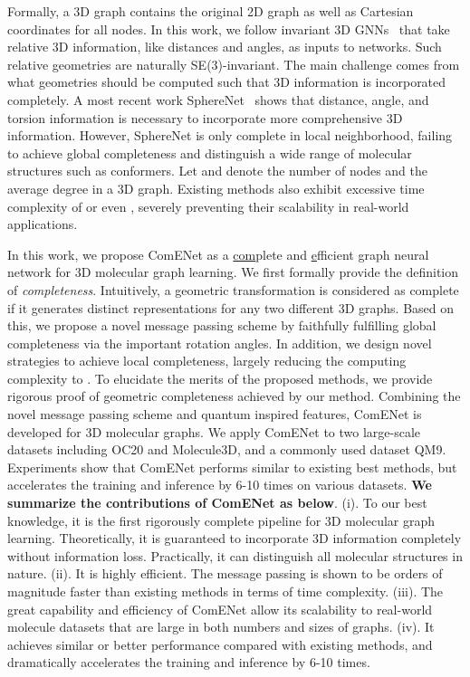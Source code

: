 \documentclass{article}
\begin{document}
Formally, a 3D graph contains the original 2D graph as well as Cartesian coordinates for all nodes. In this work, we follow
invariant 3D GNNs~\citep{schutt2017schnet,klicpera_dimenet_2020,klicpera_dimenetpp_2020,shuaibi2021rotation,liu2022spherical,klicpera2021gemnet} 
that take relative 3D information,
like distances and angles, as inputs to networks.
Such relative geometries are naturally SE(3)-invariant.
The main challenge comes from what geometries should be computed such that 3D information is incorporated completely.
A most recent work SphereNet~\citep{liu2022spherical} 
shows that distance, angle, and torsion information is
necessary to incorporate more comprehensive 3D information.
However, SphereNet is only complete in local neighborhood,
failing to achieve global completeness and distinguish a wide range of molecular structures such
as conformers.
\textcolor{COLOR}{Let  and  denote the number of nodes and the average degree in a 3D graph.}
Existing methods also exhibit excessive time complexity of
 or even , severely preventing their scalability in real-world applications.

 
In this work, we propose ComENet as a \underline{com}plete and \underline{e}fficient graph neural network for 3D molecular graph learning.
We first formally provide the definition of \emph{completeness}.
Intuitively, a geometric transformation is considered as complete if it generates distinct representations for any two different 3D graphs.
Based on this, we propose a novel message passing scheme by faithfully fulfilling global completeness via the important rotation angles.
In addition, we design novel strategies to achieve local completeness,
largely reducing the computing complexity to .
To elucidate the merits of the proposed methods,
we provide rigorous proof of geometric completeness achieved
by our method.
Combining the novel message passing scheme and quantum inspired features,
ComENet is developed for 3D molecular graphs.
We apply ComENet to two large-scale datasets including OC20 and  Molecule3D, and a 
commonly used dataset QM9.
Experiments show that ComENet performs similar to existing best methods,
but accelerates the training and inference by 6-10 times on various datasets.
\textbf{We summarize the contributions of ComENet as below}.
(i). To our best knowledge, it is the first rigorously complete pipeline for 3D molecular graph learning. Theoretically, it is guaranteed to incorporate 3D information completely without information loss. Practically, it can distinguish all molecular structures in nature.
(ii). It is highly efficient. The message passing is shown to be orders of magnitude faster than existing methods in terms of time complexity.
(iii). The great capability and efficiency of ComENet allow its scalability to real-world molecule datasets that are large in both numbers and sizes of graphs.
(iv). It achieves similar or better performance compared with existing methods, and dramatically accelerates the training and inference by 6-10 times.
\end{document}
